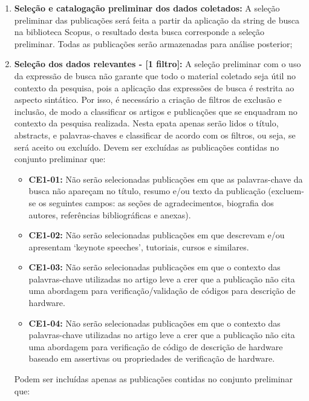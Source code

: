 \begin{enumerate}
\item \textbf{Seleção e catalogação preliminar dos dados coletados:} A seleção preliminar das publicações será feita a partir da aplicação da string de busca na biblioteca Scopus, o resultado desta busca corresponde a seleção preliminar. Todas as publicações serão armazenadas para análise posterior;

\item \textbf{Seleção dos dados relevantes - [1 filtro]:} A seleção preliminar com o uso da expressão de busca não garante que todo o material coletado seja útil no contexto da pesquisa, pois a aplicação das expressões de busca é restrita ao aspecto sintático. Por isso, é necessário a criação de filtros de exclusão e inclusão, de modo a classificar os artigos e publicações que se enquadram no contexto da pesquisa realizada. Nesta epata apenas serão lidos o título, abstracts, e palavras-chaves e classificar de acordo com os filtros, ou seja, se será aceito ou excluído. Devem ser excluídas as publicações contidas no conjunto preliminar que:
	\begin{itemize}
	\item \textbf{CE1-01:} Não serão selecionadas publicações em que as palavras-chave da busca não apareçam no título, resumo e/ou texto da publicação (excluem-se os seguintes campos: as seções de agradecimentos, biografia dos autores, referências bibliográficas e anexas).
	\item \textbf{CE1-02:} Não serão selecionadas publicações em que descrevam e/ou apresentam ‘keynote speeches’, tutoriais, cursos e similares.
	\item \textbf{CE1-03:} Não serão selecionadas publicações em que o contexto das palavras-chave utilizadas no artigo leve a crer que a publicação não cita uma abordagem para verificação/validação de códigos para descrição de hardware.   
	\item \textbf{CE1-04:} Não serão selecionadas publicações em que o contexto das palavras-chave utilizadas no artigo leve a crer que a publicação não cita uma abordagem para verificação de código de descrição de hardware baseado em assertivas ou propriedades de verificação de hardware.
\end{itemize}

Podem ser incluídas apenas as publicações contidas no conjunto preliminar que:


\end{enumerate}
